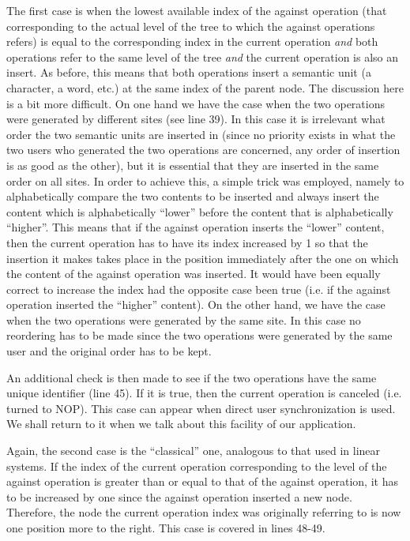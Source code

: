 The first case is when the lowest available index of the against operation (that
corresponding to the actual level of the tree to which the against operations refers)
is equal to the corresponding index in the current operation \emph{and} both operations
refer to the same level of the tree \emph{and} the current operation is also an insert.
As before, this means that both operations insert a semantic unit (a character, a word, etc.)
at the same index of the parent node. The discussion here is a bit more difficult.
On one hand we have the case when the two operations were generated by different
sites (see line 39). In this case it is irrelevant what order the two semantic units are
inserted in (since no priority exists in what the two users who generated the two
operations are concerned, any order of insertion is as good as the other), but it is
essential that they are inserted in the same order on all sites. In order to achieve
this, a simple trick was employed, namely to alphabetically compare the two contents
to be inserted and always insert the content which is alphabetically ``lower'' before
the content that is alphabetically ``higher''. This means that if the against operation
inserts the ``lower'' content, then the current operation has to have its index increased
by 1 so that the insertion it makes takes place in the position immediately after the one
on which the content of the against operation was inserted. It would have been equally
correct to increase the index had the opposite case been true (i.e. if the against
operation inserted the ``higher'' content). On the other hand, we
have the case when the two operations were generated by the same site. In this case
no reordering has to be made since the two operations were generated by the same user
and the original order has to be kept.

An additional check is then made to see if the two operations have the same unique
identifier (line 45). If it is true, then the current operation is canceled (i.e. turned
to NOP). This case can appear when direct user synchronization is used. We shall
return to it when we talk about this facility of our application.

Again, the second case is the ``classical'' one, analogous to that used in linear
systems. If the index of the current operation corresponding to the level of the
against operation is greater than or equal to that of the against operation, it has
to be increased by one since the against operation inserted a new node. Therefore, the node
the current operation index was originally referring to is now one position more to
the right. This case is covered in lines 48-49.


